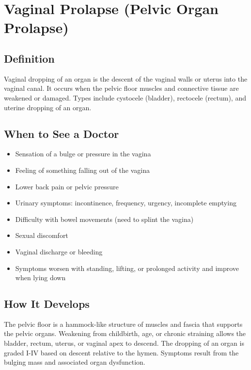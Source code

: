 \chapter{Vaginal Prolapse (Pelvic Organ Prolapse)}

\section*{Definition}
Vaginal dropping of an organ is the descent of the vaginal walls or uterus into the vaginal canal. It occurs when the pelvic floor muscles and connective tissue are weakened or damaged. Types include cystocele (bladder), rectocele (rectum), and uterine dropping of an organ.

\section*{When to See a Doctor}
\begin{itemize}
\item Sensation of a bulge or pressure in the vagina
\item Feeling of something falling out of the vagina
\item Lower back pain or pelvic pressure
\item Urinary symptoms: incontinence, frequency, urgency, incomplete emptying
\item Difficulty with bowel movements (need to splint the vagina)
\item Sexual discomfort
\item Vaginal discharge or bleeding
\item Symptoms worsen with standing, lifting, or prolonged activity and improve when lying down
\end{itemize}

\section*{How It Develops}
The pelvic floor is a hammock-like structure of muscles and fascia that supports the pelvic organs. Weakening from childbirth, age, or chronic straining allows the bladder, rectum, uterus, or vaginal apex to descend. The dropping of an organ is graded I-IV based on descent relative to the hymen. Symptoms result from the bulging mass and associated organ dysfunction.

